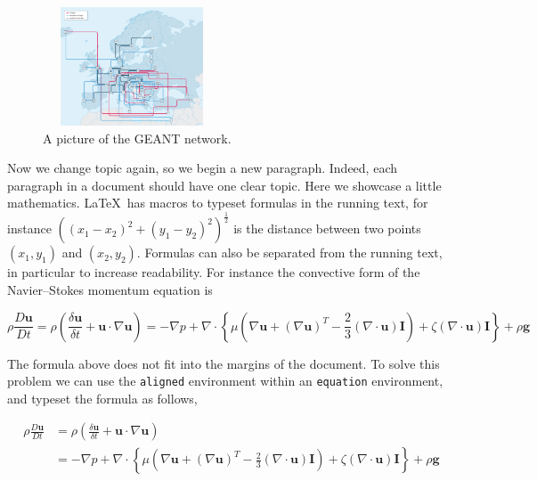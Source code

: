 \documentclass{article}
\newcommand{\latex}{\LaTeX}
\begin{document}
\begin{figure}
\label{fig:geant}
\hrulefill
\begin{center}
\includegraphics[height=133px,width=200px]{geant}
\end{center}
\caption{A picture of the GEANT network.}
\hrulefill
\end{figure}


Now we change topic again, so we begin a new paragraph.
Indeed, each paragraph in a document should have one clear
topic. Here we showcase a little mathematics. \latex\  has macros to typeset
formulas in the running text, for instance
$ ( (x_1 - x_2)^2 + (y_1 - y_2)^2 )^{\frac{1}{2}}$
is the distance between two points $(x_1,y_1)$ and  $(x_2,y_2)$.
Formulas can also be separated from the running text, in particular
to increase readability. For instance the convective form of the
Navier–Stokes momentum equation is

$$
\rho\frac{D{\mathbf u}}{D t} = \rho \left(\frac{\delta {\mathbf u}}{\delta t} + {\mathbf u} \cdot \nabla {\mathbf u} \right) = -\nabla p + \nabla \cdot \left\{ \mu (\nabla \mathbf{u} + (\nabla\mathbf{u})^{T} - \frac{2}{3}(\nabla\cdot\mathbf{u}){\mathbf I} ) + \zeta(\nabla\cdot\mathbf{u}){\mathbf I} \right\} + \rho{\mathbf g}
$$

The formula above does not fit into the margins of the document.
To solve this problem we can use the {\tt aligned} environment within an {\tt equation} environment, and typeset the formula as follows,

\begin{equation*}
  \begin{aligned}
    \rho\frac{D{\mathbf u}}{D t} & =
     \rho \left(\frac{\delta {\mathbf u}}{\delta t} + {\mathbf u} \cdot \nabla {\mathbf u} \right)\\
     & = -\nabla p + \nabla \cdot \left\{ \mu (\nabla \mathbf{u} + (\nabla\mathbf{u})^{T} - \frac{2}{3}(\nabla\cdot\mathbf{u}){\mathbf I} ) + \zeta(\nabla\cdot\mathbf{u}){\mathbf I} \right\} + \rho{\mathbf g}\\
 \end{aligned}
\end{equation*}
\end{document}
